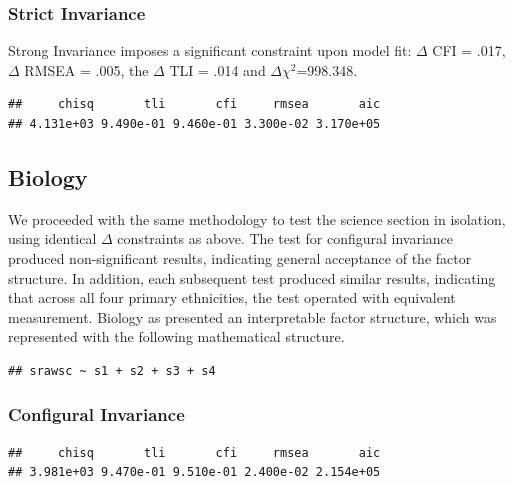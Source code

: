 \documentclass{article}\usepackage[]{graphicx}\usepackage[]{color}
\makeatletter
\newenvironment{kframe}{%
 \def\at@end@of@kframe{}%
 \ifinner\ifhmode%
  \def\at@end@of@kframe{\end{minipage}}%
  \begin{minipage}{\columnwidth}%
 \fi\fi%
 \def\FrameCommand##1{\hskip\@totalleftmargin \hskip-\fboxsep
 \colorbox{shadecolor}{##1}\hskip-\fboxsep
     \hskip-\linewidth \hskip-\@totalleftmargin \hskip\columnwidth}%
 \MakeFramed {\advance\hsize-\width
   \@totalleftmargin\z@ \linewidth\hsize
   \@setminipage}}%
 {\par\unskip\endMakeFramed%
 \at@end@of@kframe}
\newenvironment{knitrout}{}{} %
\makeatother
\begin{document}
\subsubsection{Strict Invariance}
Strong Invariance imposes a significant constraint upon model fit: $\Delta$ CFI = .017, $\Delta$ RMSEA = .005, the $\Delta$ TLI = .014 and $\Delta$$\chi^2$=998.348. 

\begin{knitrout}
\color{fgcolor}\begin{kframe}
\begin{verbatim}
##     chisq       tli       cfi     rmsea       aic 
## 4.131e+03 9.490e-01 9.460e-01 3.300e-02 3.170e+05
\end{verbatim}
\end{kframe}
\end{knitrout}


\subsection{Biology}
We proceeded with the same methodology to test the science section in isolation, using identical $\Delta$ constraints as above. The test for configural invariance produced non-significant results, indicating general acceptance of the factor structure. In addition, each subsequent test produced similar results, indicating that across all four primary ethnicities, the test operated with equivalent measurement. Biology as presented an interpretable factor structure, which was represented with the following mathematical structure.
\begin{knitrout}
\color{fgcolor}\begin{kframe}
\begin{verbatim}
## srawsc ~ s1 + s2 + s3 + s4
\end{verbatim}
\end{kframe}
\end{knitrout}


\subsubsection{Configural Invariance}
\begin{knitrout}
\color{fgcolor}\begin{kframe}
\begin{verbatim}
##     chisq       tli       cfi     rmsea       aic 
## 3.981e+03 9.470e-01 9.510e-01 2.400e-02 2.154e+05
\end{verbatim}
\end{kframe}
\end{knitrout}
\end{document}
